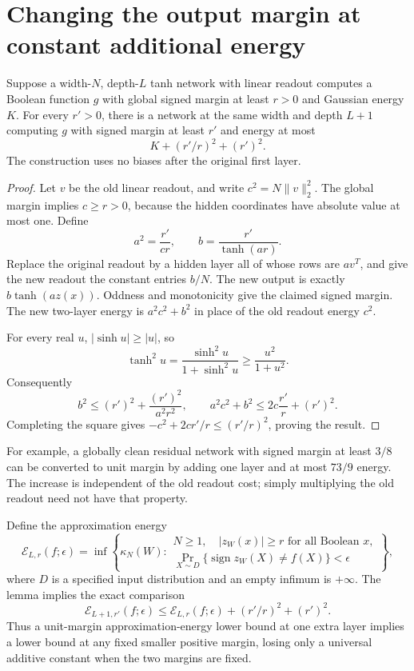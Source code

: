\section{Changing the output margin at constant additional energy}
\label{sec:margin-transfer}

\begin{lemma}
\label{lem:one-layer-margin-transfer}
Suppose a width-$N$, depth-$L$ tanh network with linear readout computes
a Boolean function $g$ with global signed margin at least $r>0$ and
Gaussian energy $K$. For every $r'>0$, there is a network at the same
width and depth $L+1$ computing $g$ with signed margin at least $r'$ and
energy at most
\[
 K+(r'/r)^2+(r')^2.
\]
The construction uses no biases after the original first layer.
\end{lemma}

\begin{proof}
Let $v$ be the old linear readout, and write
$c^2=N\|v\|_2^2$. The global margin implies $c\ge r>0$, because the
hidden coordinates have absolute value at most one. Define
\[
 a^2=\frac{r'}{cr},\qquad b=\frac{r'}{\tanh(ar)}.
\]
Replace the original readout by a hidden layer all of whose rows are
$av^T$, and give the new readout the constant entries $b/N$. The new
output is exactly $b\tanh(az(x))$. Oddness and monotonicity give the
claimed signed margin. The new two-layer energy is $a^2c^2+b^2$ in
place of the old readout energy $c^2$.

For every real $u$, $|\sinh u|\ge |u|$, so
\[
 \tanh^2u=\frac{\sinh^2u}{1+\sinh^2u}
       \ge\frac{u^2}{1+u^2}.
\]
Consequently
\[
 b^2\le(r')^2+\frac{(r')^2}{a^2r^2},\qquad
 a^2c^2+b^2\le 2c\frac{r'}r+(r')^2.
\]
Completing the square gives
$-c^2+2cr'/r\le(r'/r)^2$, proving the result.
\end{proof}

For example, a globally clean residual network with signed margin at
least $3/8$ can be converted to unit margin by adding one layer and at
most $73/9$ energy. The increase is independent of the old readout cost;
simply multiplying the old readout need not have that property.

Define the approximation energy
\[
 \mathcal E_{L,r}(f;\epsilon)
 =\inf\left\{\kappa_N(W):\begin{array}{l}
 N\ge1,\quad |z_W(x)|\ge r\text{ for all Boolean }x,\\
 \Pr_{X\sim D}\{\operatorname{sign}z_W(X)\ne f(X)\}<\epsilon
 \end{array}\right\},
\]
where $D$ is a specified input distribution and an empty infimum is
$+\infty$. The lemma implies the exact comparison
\[
 \mathcal E_{L+1,r'}(f;\epsilon)
 \le \mathcal E_{L,r}(f;\epsilon)+(r'/r)^2+(r')^2.
\]
Thus a unit-margin approximation-energy lower bound at one extra layer
implies a lower bound at any fixed smaller positive margin, losing only
a universal additive constant when the two margins are fixed.
